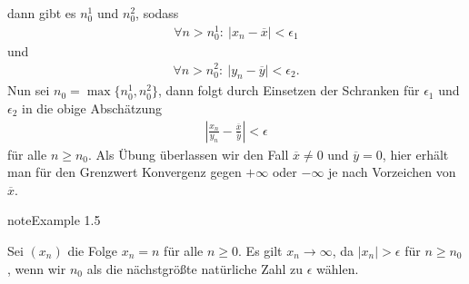 \documentclass[letterpaper,10pt,english]{jupyterBook}
\begin{document}
dann gibt es \(n_0^1\) und \(n_0^2\), sodass
\begin{equation*}
\begin{split} \forall n > n_0^1:~\vert x_n - \overline{x} \vert < \epsilon_1 \end{split}
\end{equation*}
und
\begin{equation*}
\begin{split} \forall n > n_0^2:~\vert y_n - \overline{y} \vert < \epsilon_2 .\end{split}
\end{equation*}
Nun sei \(n_0 = \max\{n_0^1,n_0^2\}\), dann folgt durch Einsetzen der Schranken für \(\epsilon_1\) und \(\epsilon_2\) in die obige Abschätzung
\begin{equation*}
\begin{split}  \left\vert \frac{x_n}{y_n} -\frac{\overline{x}}{\overline{y}} \right\vert < \epsilon \end{split}
\end{equation*}
für alle \(n \geq n_0\). Als Übung überlassen wir den Fall \(\overline{x} \neq 0\) und \(\overline{y}=0\), hier erhält man für den Grenzwert Konvergenz gegen \(+\infty\) oder \(-\infty\) je nach Vorzeichen von \(\overline{x}\).
\label{vorkurs/folgen:example-5}
\begin{sphinxadmonition}{note}{Example 1.5}



Sei \((x_n)\) die  Folge \(x_n = n \) für alle \(n\geq 0\). Es gilt \(x_n \rightarrow \infty\), da \(\vert x_n \vert > \epsilon\) für \(n\geq n_0\), wenn wir \(n_0\) als die nächstgrößte natürliche Zahl zu \(\epsilon\) wählen.
\end{sphinxadmonition}
\end{document}
